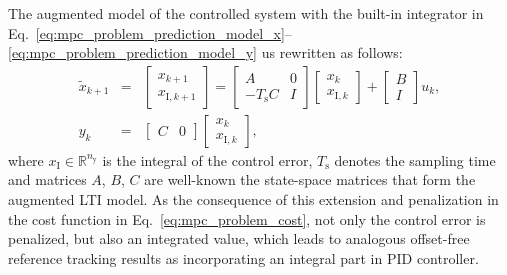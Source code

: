 \documentclass[preprint,12pt]{elsarticle}
\begin{document}
	The augmented model of the controlled system with the built-in integrator in Eq.~\eqref{eq:mpc_problem_prediction_model_x}--\eqref{eq:mpc_problem_prediction_model_y} us rewritten as follows:
	\begin{subequations}
		\begin{eqnarray} 
			\label{eq:mpc_augmented_model_x} 
			\widetilde{x}_{k+1} &=& \begin{bmatrix} x_{k+1} \\ x_{\mathrm{I},k+1}\end{bmatrix} = \begin{bmatrix} A & \textit{0} \\ -T_\mathrm{s} C & I \end{bmatrix} \begin{bmatrix} x_{k} \\ x_{\mathrm{I},k} \end{bmatrix} + \begin{bmatrix} B \\ I \end{bmatrix} u_{k}, \\
			\label{eq:mpc_augmented_model_y}
			y_k &=& \begin{bmatrix} C & \textit{0} \end{bmatrix} \begin{bmatrix} x_{k} \\ x_{\mathrm{I},k} \end{bmatrix},
		\end{eqnarray}
	\end{subequations}
	where $x_{\mathrm{I}} \in \mathbb{R}^{n_{\mathrm{y}}}$ is the integral of the control error, $T_\mathrm{s}$ denotes the sampling time and matrices $A$, $B$, $C$ are well-known the state-space matrices that form the augmented LTI model. As the consequence of this extension and penalization in the cost function in Eq.~\eqref{eq:mpc_problem_cost}, not only the control error is penalized, but also an integrated value, which leads to analogous offset-free reference tracking results as incorporating an integral part in PID controller.
	
\end{document}
